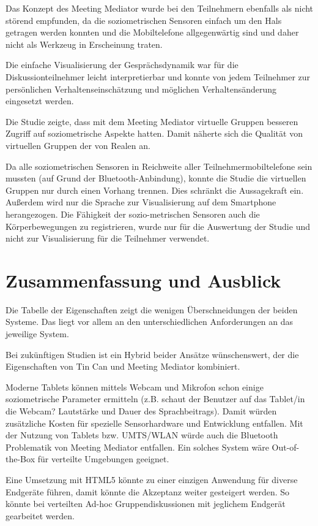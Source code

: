 \documentclass{seminarvorlage}
\begin{document}
Das Konzept des Meeting Mediator wurde bei den Teilnehmern ebenfalls als nicht
störend empfunden, da die soziometrischen Sensoren einfach um den Hals getragen
werden konnten und die Mobiltelefone allgegenwärtig sind und daher nicht als
Werkzeug in Erscheinung traten.

Die einfache Visualisierung der Gesprächsdynamik war für die
Diskussionteilnehmer leicht interpretierbar und konnte von jedem Teilnehmer zur
per\-sön\-lich\-en Ver\-haltens\-ein\-schätz\-ung und möglichen
Verhaltensänderung eingesetzt werden.

Die Studie \cite{KimChaHolPent2008} zeigte, dass mit dem Meeting Mediator
virtuelle Gruppen besseren Zugriff auf soziometrische Aspekte hatten. Damit
näherte sich die Qualität von virtuellen Gruppen der von Realen an.

Da alle soziometrischen Sensoren in Reichweite aller Teilnehmermobiltelefone
sein mussten (auf Grund der Bluetooth-Anbindung), konnte die Studie
\cite{KimChaHolPent2008} die virtuellen Gruppen nur durch einen Vorhang trennen.
Dies schränkt die Aussagekraft ein.
Außerdem wird nur die Sprache zur Visualisierung auf dem Smartphone
herangezogen. Die Fähigkeit der sozio-metrischen Sensoren auch die
Körperbewegungen zu registrieren, wurde nur für die Auswertung der Studie
\cite{KimChaHolPent2008} und nicht zur Visualisierung für die Teilnehmer
verwendet.


\section{Zusammenfassung und Ausblick}
Die Tabelle der Eigenschaften zeigt die wenigen Über\-schneid\-ung\-en
der beiden Systeme. Das liegt vor allem an den unterschiedlichen Anforderungen
an das jeweilige System.

Bei zukünftigen Studien ist ein Hybrid beider Ansätze
wün\-schens\-wert, der die Eigenschaften von Tin Can und Meeting
Mediator kombiniert.

Moderne Tablets können mittels Webcam und Mikrofon schon einige soziometrische
Parameter ermitteln (z.B. schaut der Benutzer auf das Tablet/in die Webcam?
Lautstärke und Dauer des Sprachbeitrags). Damit würden zusätzliche Kosten für
spezielle Sensorhardware und Entwicklung entfallen. Mit der Nutzung von Tablets
bzw.
UMTS/WLAN würde auch die Bluetooth Problematik von Meeting Mediator entfallen.
Ein solches System wäre Out-of-the-Box für verteilte Umgebungen geeignet.

Eine Umsetzung mit HTML5 könnte zu einer einzigen Anwendung für diverse
Endgeräte führen, damit könn\-te die Akzeptanz weiter gesteigert werden. So
könn\-te bei verteilten Ad-hoc Gruppendiskussionen mit jeglichem Endgerät
gearbeitet werden.
\end{document}
